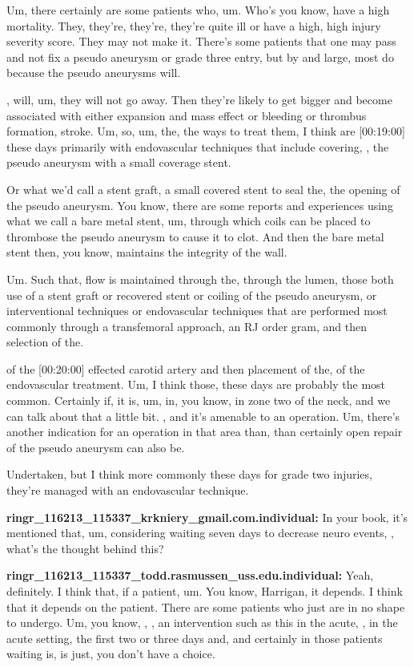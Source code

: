 \documentclass[
]{book}
\begin{document}
Um, there certainly are some patients who, um. Who's you know, have a
high mortality. They, they're, they're, they're quite ill or have a
high, high injury severity score. They may not make it. There's some
patients that one may pass and not fix a pseudo aneurysm or grade three
entry, but by and large, most do because the pseudo aneurysms will.

, will, um, they will not go away. Then they're likely to get bigger and
become associated with either expansion and mass effect or bleeding or
thrombus formation, stroke. Um, so, um, the, the ways to treat them, I
think are {[}00:19:00{]} these days primarily with endovascular techniques
that include covering, , the pseudo aneurysm with a small coverage
stent.

Or what we'd call a stent graft, a small covered stent to seal the, the
opening of the pseudo aneurysm. You know, there are some reports and
experiences using what we call a bare metal stent, um, through which
coils can be placed to thrombose the pseudo aneurysm to cause it to
clot. And then the bare metal stent then, you know, maintains the
integrity of the wall.

Um. Such that, flow is maintained through the, through the lumen, those
both use of a stent graft or recovered stent or coiling of the pseudo
aneurysm, or interventional techniques or endovascular techniques that
are performed most commonly through a transfemoral approach, an RJ order
gram, and then selection of the.

of the {[}00:20:00{]} effected carotid artery and then placement of the, of
the endovascular treatment. Um, I think those, these days are probably
the most common. Certainly if, it is, um, in, you know, in zone two of
the neck, and we can talk about that a little bit. , and it's amenable
to an operation. Um, there's another indication for an operation in that
area than, than certainly open repair of the pseudo aneurysm can also
be.

Undertaken, but I think more commonly these days for grade two injuries,
they're managed with an endovascular technique.

\textbf{ringr\_116213\_115337\_krkniery\_gmail.com.individual:} In your book,
it's mentioned that, um, considering waiting seven days to decrease
neuro events, , what's the thought behind this?

\textbf{ringr\_116213\_115337\_todd.rasmussen\_uss.edu.individual:} Yeah,
definitely. I think that, if a patient, um. You know, Harrigan, it
depends. I think that it depends on the patient. There are some patients
who just are in no shape to undergo. Um, you know, , , an intervention
such as this in the acute, , in the acute setting, the first two or
three days and, and certainly in those patients waiting is, is just, you
don't have a choice.
\end{document}
